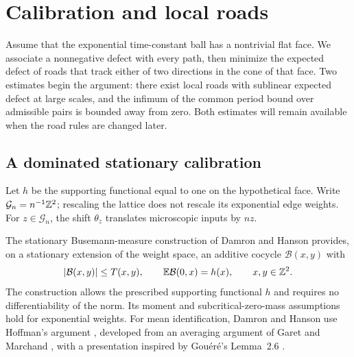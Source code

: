 \section{Calibration and local roads}\label{sec:roads}

Assume that the exponential time-constant ball has a nontrivial flat
face.  We associate a nonnegative defect with every path, then minimize
the expected defect of roads that track either of two directions in
the cone of that face.  Two estimates begin the argument: there exist
local roads with sublinear expected defect at large scales, and the
infimum of the common period bound over admissible pairs is bounded
away from zero.  Both estimates will remain available when the road
rules are changed later.

\subsection{A dominated stationary calibration}
\label{sec:fb-calibration}

Let $h$ be the supporting functional equal to one on the hypothetical
face.  Write $\mathcal G_n=n^{-1}\mathbb Z^2$; rescaling the lattice
does not rescale its exponential edge weights.  For $z\in\mathcal G_n$,
the shift $\theta_z$ translates microscopic inputs by $nz$.

The stationary Busemann-measure construction of Damron and Hanson
\cite[Section~3, Propositions~3.2 and~3.4, and Theorem~3.5]{DH2014}
provides, on a stationary extension of the weight space, an additive
cocycle $\mathcal B(x,y)$ with
\[
 |\mathcal B(x,y)|\le T(x,y),\qquad
 \mathbb E \mathcal B(0,x)=h(x),\qquad x,y\in\mathbb Z^2.
\]
The construction allows the prescribed supporting functional $h$ and
requires no differentiability of the norm.  Its moment and
subcritical-zero-mass assumptions hold for exponential weights.
For mean identification, Damron and Hanson use Hoffman's argument
\cite{Hoffman2008}, developed from an averaging argument of Garet and
Marchand \cite{GaretMarchand2005}, with a presentation inspired by
Gou\'er\'e's Lemma~2.6 \cite{Gouere2007}.


